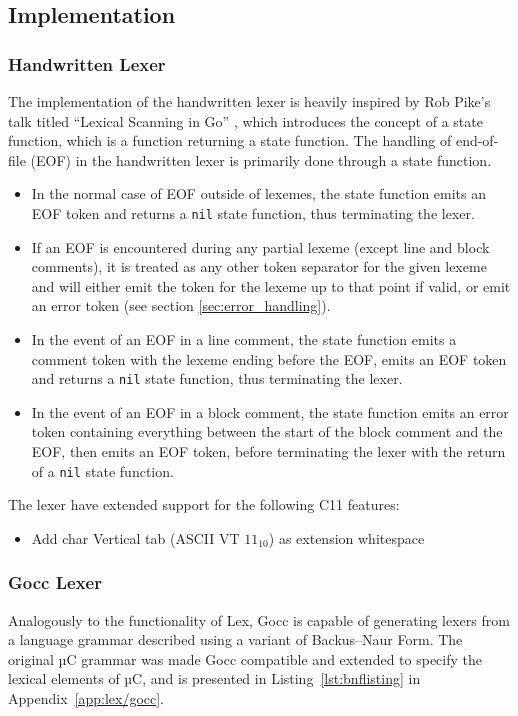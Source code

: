 \subsection{Implementation}

\subsubsection{Handwritten Lexer}

The implementation of the handwritten lexer is heavily inspired by Rob Pike's talk titled ``Lexical Scanning in Go'' \cite{lexical_scanning_in_go}, which introduces the concept of a state function, which is a function returning a state function. The handling of end-of-file (EOF) in the handwritten lexer is primarily done through a state function.

\begin{itemize}
	\item In the normal case of EOF outside of lexemes, the state function emits an EOF token and returns a \texttt{nil} state function, thus terminating the lexer.
	\item If an EOF is encountered during any partial lexeme (except line and block comments), it is treated as any other token separator for the given lexeme and will either emit the token for the lexeme up to that point if valid, or emit an error token (see section \ref{sec:error_handling}).
	\item In the event of an EOF in a line comment, the state function emits a comment token with the lexeme ending before the EOF, emits an EOF token and returns a \texttt{nil} state function, thus terminating the lexer.
	\item In the event of an EOF in a block comment, the state function emits an error token containing everything between the start of the block comment and the EOF, then emits an EOF token, before terminating the lexer with the return of a \texttt{nil} state function.
\end{itemize}

The lexer have extended support for the following C11 features:

\begin{itemize}
	\item Add char Vertical tab (ASCII VT $11_{10}$) as extension whitespace
\end{itemize}

\subsubsection{Gocc Lexer}

Analogously to the functionality of Lex, Gocc is capable of generating lexers from a language grammar described using a variant of Backus–Naur Form. The original µC grammar was made Gocc compatible and extended to specify the lexical elements of µC, and is presented in Listing~\ref{lst:bnflisting} in Appendix~\ref{app:lex/gocc}.
